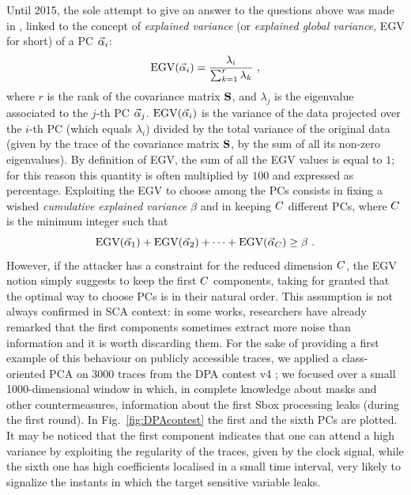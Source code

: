 Until 2015, the sole attempt to give an answer to the questions above was made in \cite{choudary2014efficient}, linked to the concept of {\em explained variance} (or {\em explained global variance}, EGV for short) of a PC $\vec{\alpha}_i$:
\begin{equation}\label{eq:EGV}
\mathrm{EGV}(\vec{\alpha}_i) =  \frac{\lambda_i}{\sum_{k=1}^r\lambda_k} \mbox{ ,}
\end{equation}
where $r$ is the rank of the covariance matrix $\textbf{S}$, and $\lambda_j$ is the eigenvalue associated to the $j$-th PC $\vec{\alpha}_j$. $\mathrm{EGV}(\vec{\alpha}_i)$ is the variance of the data projected over the $i$-th PC (which equals $\lambda_i$) divided by the total variance of the original data (given by the trace of the covariance matrix $\textbf{S}$, \ie by the sum of all its non-zero eigenvalues). By definition of EGV, the sum of all the EGV values is equal to $1$; for this reason this quantity is often multiplied by $100$ and expressed as percentage.
Exploiting the EGV to choose among the PCs consists in fixing a wished {\em cumulative explained variance} $\beta$ and in keeping $C$ different PCs, where $C$ is the minimum integer such that
\begin{equation}
\mbox{EGV}(\vec{\alpha}_1) +\mbox{EGV}(\vec{\alpha}_2) + \dots +\mbox{EGV}(\vec{\alpha}_C) \geq \beta \mbox{ .}
\end{equation}
However, if the attacker has a constraint for the reduced dimension $C$, the EGV notion simply suggests to keep the first $C$ components, taking for granted that the optimal way to choose PCs is in their natural order. This assumption is not always confirmed in SCA context: in some works, researchers have already remarked that the first components sometimes extract more noise than information \cite{Batina2012,specht} and it is worth discarding them. For the sake of providing a first example of this behaviour on publicly accessible traces, we applied a class-oriented PCA on 3000 traces from the DPA contest v4 \cite{DPAcontest}; we focused over a small 1000-dimensional window in which, in complete knowledge about masks and other countermeasures, information about the first Sbox processing leaks (during the first round). In Fig.~\ref{fig:DPAcontest} the first and the sixth PCs are plotted. It may be noticed that the first component indicates that one can attend a high variance by exploiting the regularity of the traces, given by the clock signal, while the sixth one has high coefficients localised in a small time interval, very likely to signalize the instants in which the target sensitive variable leaks.\\

